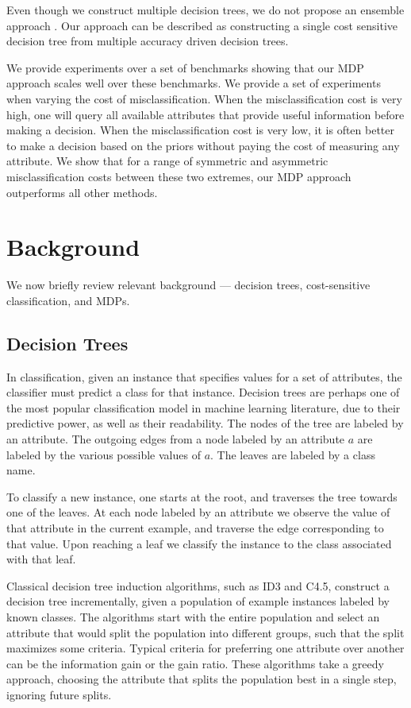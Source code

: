 \documentclass[letterpaper]{article}
\theoremstyle{definition}
\begin{document}
Even though we construct multiple decision trees, we do not propose an ensemble approach \cite{banfield2007comparison}. Our approach can be described as constructing a single cost sensitive decision tree from multiple accuracy driven decision trees.

We provide experiments over a set of benchmarks \cite{LomaxV13} showing that our MDP approach scales well over these benchmarks. We provide a set of experiments when varying the cost of misclassification. When the misclassification cost is very high, one will query all available attributes that provide useful information before making a decision. When the misclassification cost is very low, it is often better to make a decision based on the priors without paying the cost of measuring any attribute. We show that for a range of symmetric and asymmetric misclassification costs between these two extremes, our MDP approach outperforms all other methods. 

\section{Background}

We now briefly review relevant background --- decision trees, cost-sensitive classification, and MDPs.

\subsection{Decision Trees}

In classification, given an instance that specifies values for a set of attributes, the classifier must predict a class for that instance. Decision trees are perhaps one of the most popular classification model in machine learning literature, due to their predictive power, as well as their readability. The nodes of the tree are labeled by an attribute. The outgoing edges from a node labeled by an attribute $a$ are labeled by the various possible values of $a$. The leaves are labeled by a class name.

To classify a new instance, one starts at the root, and traverses the tree towards one of the leaves. At each node labeled by an attribute we observe the value of that attribute in the current example, and traverse the edge corresponding to that value. Upon reaching a leaf we classify the instance to the class associated with that leaf.

Classical decision tree induction algorithms, such as ID3 and C4.5, construct a decision tree incrementally, given a population of example instances labeled by known classes. The algorithms start with the entire population and select an attribute that would split the population into different groups, such that the split maximizes some criteria. Typical criteria for preferring one attribute over another can be the information gain or the gain ratio. These algorithms take a greedy approach, choosing the attribute that splits the population best in a single step, ignoring future splits.
\end{document}
